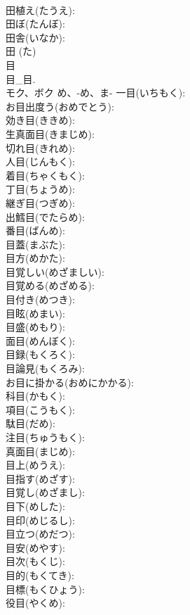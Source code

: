 \documentclass[8pt]{extreport}
\begin{document}
\begin{CJK}{UTF8}{min}
\\	田植え(たうえ): 
\\	田ぼ(たんぼ): 
\\	田舎(いなか): 
\\	田 (た)
\\	目			
\\	目_目.	
\\	モク、ボク	め、-め、ま-	一目(いちもく): 
\\	お目出度う(おめでとう): 
\\	効き目(ききめ): 
\\	生真面目(きまじめ): 
\\	切れ目(きれめ): 
\\	人目(じんもく): 
\\	着目(ちゃくもく): 
\\	丁目(ちょうめ): 
\\	継ぎ目(つぎめ): 
\\	出鱈目(でたらめ): 
\\	番目(ばんめ): 
\\	目蓋(まぶた): 
\\	目方(めかた): 
\\	目覚しい(めざましい): 
\\	目覚める(めざめる): 
\\	目付き(めつき): 
\\	目眩(めまい): 
\\	目盛(めもり): 
\\	面目(めんぼく): 
\\	目録(もくろく): 
\\	目論見(もくろみ): 
\\	お目に掛かる(おめにかかる): 
\\	科目(かもく): 
\\	項目(こうもく): 
\\	駄目(だめ): 
\\	注目(ちゅうもく): 
\\	真面目(まじめ): 
\\	目上(めうえ): 
\\	目指す(めざす): 
\\	目覚し(めざまし): 
\\	目下(めした): 
\\	目印(めじるし): 
\\	目立つ(めだつ): 
\\	目安(めやす): 
\\	目次(もくじ): 
\\	目的(もくてき): 
\\	目標(もくひょう): 
\\	役目(やくめ): 

\end{CJK}
\end{document}
